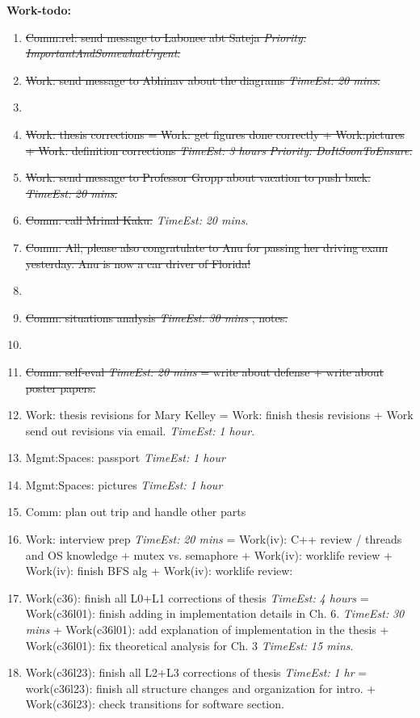 \documentclass[11pt]{article}
\newcommand{\doneTask}[1]{\item \sout{\small #1}}
\newcommand{\te}[1]{\textit{TimeEst:} \textit{#1}}
\newcommand{\priority}[1]{\textit{Priority:} \textit{#1}}
\newcommand{\prio}[1]{\textit{Priority:} \textit{#1}}
\begin{document}
\textbf{Work-todo:}\\ 
\begin{enumerate}

\doneTask{ Comm:rel: send message to Labonee abt Sateja
  \priority{ImportantAndSomewhatUrgent}.} 


\doneTask{ Work: send message to Abhinav about the diagrams \te{20
    mins}. } 

\item \doneTask{Work: thesis corrections = Work: get figures done correctly +
  Work:pictures + Work: definition corrections \te{3 hours}
  \prio{DoItSoonToEnsure}. } 

\doneTask{ Work: send message to Professor Gropp about vacation to push
  back. \te{20 mins}. } 
\doneTask{ Comm: call Mrinal Kaku.} \te{20 mins}.

\doneTask{ Comm:   All, please also congratulate to Anu for passing her
  driving exam yesterday. Anu is now a car driver of Florida!} 
\item \doneTask{Comm: situations analysis \te{ 30 mins }, notes. }
\item \doneTask{Comm: self-eval \te{20 mins} = write about defense  + write
  about poster papers. }


 \item Work: thesis revisions for Mary Kelley = Work: finish thesis
   revisions + Work send out revisions via email. \te {1 hour}. 

 \item Mgmt:Spaces: passport \te{1 hour} 

 \item Mgmt:Spaces: pictures \te {1 hour} 

\item Comm: plan out trip and handle other parts

\item Work: interview prep \te{20 mins}  = 
Work(iv): C++ review / threads and OS  knowledge + mutex vs. semaphore 
 + Work(iv): worklife review +  Work(iv): finish BFS alg + Work(iv):
 worklife review: 

\item Work(c36): finish all L0+L1 corrections of thesis \te{4 hours} =
  Work(c36l01): finish adding in implementation details in Ch. 6.  \te{30
    mins} + Work(c36l01): add explanation of implementation in the thesis
  + Work(c36l01): fix theoretical analysis for Ch. 3 \te{15 mins}. 

\item Work(c36l23): finish all L2+L3 corrections of thesis \te{1 hr}  =
  work(c36l23): finish all structure changes and organization for 
  intro. + Work(c36l23): check transitions for software section. 


\end{enumerate}
\end{document}
